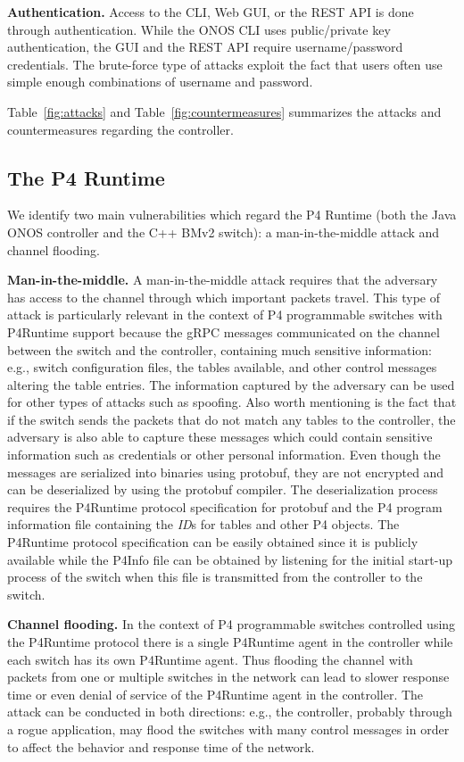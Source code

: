 \documentclass[10pt,sigconf]{acmart}
\begin{document}
\textbf{Authentication.} Access to the CLI, 
Web GUI, or the REST API is done through authentication. 
While the ONOS CLI uses
public/private key authentication, the GUI and the REST API 
require username/password credentials.
The brute-force type of attacks exploit the fact that users
often use simple enough combinations of username and
password.


Table~\ref{fig:attacks} and Table~\ref{fig:countermeasures} summarizes the 
attacks and countermeasures regarding the controller.

\subsection{The P4 Runtime}

We identify two main vulnerabilities
which regard the P4 Runtime (both
the Java ONOS controller and the C++ BMv2 switch): a man-in-the-middle
attack and channel flooding.

\textbf{Man-in-the-middle.} A man-in-the-middle attack requires that the 
adversary has access to the channel
through which important packets travel. 
This type of attack is particularly relevant in the context of 
P4 programmable switches with
P4Runtime support because the gRPC messages communicated
on the channel between
the switch and the controller, containing much sensitive information:
e.g., switch configuration files, the tables
available, and other control messages altering the table entries.
%
The information captured by the adversary can be used for other types
of attacks such as spoofing. Also worth mentioning is the fact that 
if the switch sends the packets that do not match any tables to the
controller, the adversary 
is also able to capture
these messages which could contain sensitive information such as credentials or other
personal information.
Even though the messages are serialized into binaries 
using protobuf, they are not encrypted and can be deserialized 
by using the protobuf compiler. The deserialization
process requires the P4Runtime protocol specification for 
protobuf and the
P4 program information file containing the \textit{ID}s for 
tables and other P4 objects. 
The P4Runtime protocol specification can be easily 
obtained since it is publicly available while the P4Info file 
can be obtained by listening for the initial start-up process
of the switch when this file is transmitted from the controller to the switch.

\textbf{Channel flooding.} In the context
of P4 programmable switches controlled using the P4Runtime protocol 
there is a
single P4Runtime agent in the controller while 
each switch has its own P4Runtime
agent. Thus flooding the channel with packets from 
one or multiple switches in the
network can lead to slower response time or
 even denial of service of the P4Runtime
agent in the controller.
The attack can be conducted in both directions: e.g.,
the controller, probably
through a rogue application, may flood the switches with 
many control messages in order
to affect the behavior and response time of the network.
\end{document}
